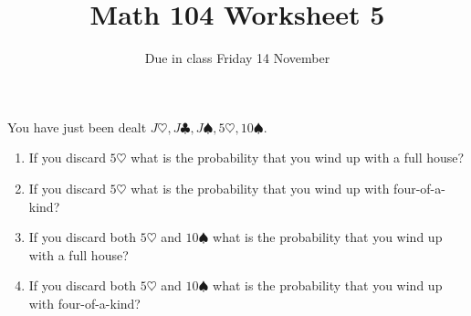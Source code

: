 \documentclass[12pt]{article}
\author{}\date{Due in class Friday 14 November}
\title{Math 104 Worksheet 5}\author{}
\begin{document}
\maketitle
\pagestyle{empty}
You have just been dealt
$J\heartsuit,J\clubsuit,J\spadesuit,5\heartsuit,10\spadesuit$.
\begin{enumerate}
\item If you discard $5\heartsuit$ what is the probability
that you wind up with a full house?
\item If you discard $5\heartsuit$ what is the probability
that you wind up with four-of-a-kind?
\item If you discard both $5\heartsuit$ and $10\spadesuit$
what is the probability that you wind up with a full house?
\item If you discard both $5\heartsuit$ and $10\spadesuit$
what is the probability that you wind up with four-of-a-kind?
\end{enumerate}
\end{document}
